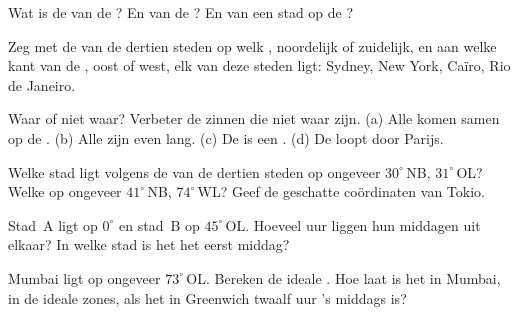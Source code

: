 \begin{exercise}[$\star$]\label{exo:g6:latitude-longitude:2}
Wat is de  van de ? En van de ? En van een
stad op de ?
\end{exercise}

\begin{exercise}[$\star$]\label{exo:g6:latitude-longitude:3}
Zeg met de  van de dertien steden op welk , noordelijk of
zuidelijk, en aan welke kant van de , oost of west, elk van
deze steden ligt: Sydney, New York, Caïro, Rio de Janeiro.
\end{exercise}

\begin{exercise}[$\star$]\label{exo:g6:latitude-longitude:4}
Waar of niet waar? Verbeter de zinnen die niet waar zijn.
(a) Alle  komen samen op de .
(b) Alle  zijn even lang.
(c) De  is een .
(d) De  loopt door Parijs.
\end{exercise}

\begin{exercise}[$\star\star$]\label{exo:g6:latitude-longitude:5}
Welke stad ligt volgens de  van de dertien steden op ongeveer
$30^\circ$\,NB, $31^\circ$\,OL? Welke op ongeveer $41^\circ$\,NB,
$74^\circ$\,WL? Geef de geschatte coördinaten van Tokio.
\end{exercise}

\begin{exercise}[$\star\star$]\label{exo:g6:latitude-longitude:6}
Stad~A ligt op  $0^\circ$ en stad~B op $45^\circ$\,OL. Hoeveel
uur liggen hun middagen uit elkaar? In welke stad is het het eerst middag?
\end{exercise}

\begin{exercise}[$\star\star$]\label{exo:g6:latitude-longitude:7}
Mumbai ligt op ongeveer $73^\circ$\,OL. Bereken de ideale . Hoe laat
is het in Mumbai, in de ideale zones, als het in Greenwich twaalf uur
's middags is?
\end{exercise}

